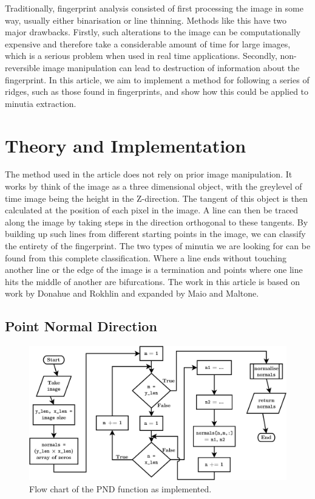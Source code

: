\documentclass[11pt,a4paper]{article}
\begin{document}
\begin{multicols}{2}
        Traditionally, fingerprint analysis consisted of first processing the image in some way, usually either binarisation\supercite{Moayer} or line thinning. Methods like this have two major drawbacks. Firstly, such alterations to the image can be computationally expensive and therefore take a considerable amount of time for large images, which is a serious problem when used in real time applications. Secondly, non-reversible image manipulation can lead to destruction of information about the fingerprint. In this article, we aim to implement a method for following a series of ridges, such as those found in fingerprints, and show how this could be applied to minutia extraction.



\section{Theory and Implementation}
        The method used in the article does not rely on prior image manipulation. It works by think of the image as a three dimensional object, with the greylevel of time image being the height in the Z-direction. The tangent of this object is then calculated at the position of each pixel in the image. A line can then be traced along the image by taking steps in the direction orthogonal to these tangents. By building up such lines from different starting points in the image, we can classify the entirety of the fingerprint. The two types of minutia we are looking for can be found from this complete classification. Where a line ends without touching another line or the edge of the image is a termination and points where one line hits the middle of another are bifurcations. The work in this article is based on work by Donahue and Rokhlin\supercite{Donahue} and expanded by Maio and Maltone\supercite{Maio}.


	\subsection{Point Normal Direction}
\begin{figure}
\centering
\includegraphics[width = \textwidth]{PND}
\caption{Flow chart of the PND function as implemented.}
\label{fig:PND-alg}
\end{figure}



\end{multicols}
\end{document}
